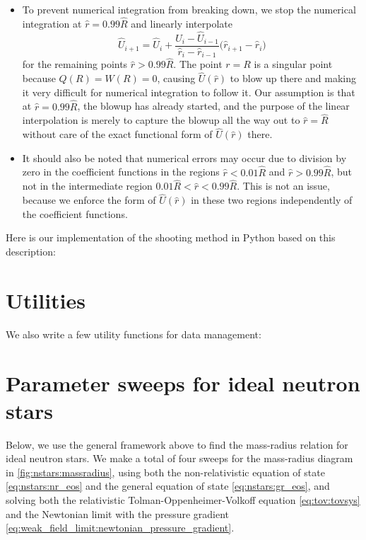 \begin{itemize}
\begin{subequations}
      \end{subequations}
\item To prevent numerical integration from breaking down, we stop the numerical integration at $\hat{r} = 0.99 \hat{R}$ and linearly interpolate
      \begin{equation}
          \hat{U}_{i+1} = \hat{U}_i + \frac{\hat{U}_i - \hat{U}_{i-1}}{\hat{r}_i - \hat{r}_{i-1}} \Big( \hat{r}_{i+1} - \hat{r}_i \Big)
      \end{equation}
      for the remaining points $\hat{r} > 0.99 \hat{R}$.
      The point $r=R$ is a singular point because $Q(R) = W(R) = 0$, causing $\hat{U}(\hat{r})$ to blow up there and making it very difficult for numerical integration to follow it.
      Our assumption is that at $\hat{r} = 0.99 \hat{R}$, the blowup has already started, and the purpose of the linear interpolation is merely to capture the blowup all the way out to $\hat{r}=\hat{R}$ without care of the exact functional form of $\hat{U}(\hat{r})$ there.
\item It should also be noted that numerical errors may occur due to division by zero in the coefficient functions in the regions $\hat{r} < 0.01 \hat{R}$ and $\hat{r} > 0.99 \hat{R}$, but not in the intermediate region $0.01 \hat{R} < \hat{r} < 0.99 \hat{R}$.
      This is not an issue, because we enforce the form of $\hat{U}(\hat{r})$ in these two regions independently of the coefficient functions.
\end{itemize}

Here is our implementation of the shooting method in Python based on this description:


\section{Utilities}

We also write a few utility functions for data management:


\section{Parameter sweeps for ideal neutron stars}
\label{sec:num:nstars}

Below, we use the general framework above to find the mass-radius relation for ideal neutron stars.
We make a total of four sweeps for the mass-radius diagram in \cref{fig:nstars:massradius}, using both the non-relativistic equation of state \eqref{eq:nstars:nr_eos} and the general equation of state \eqref{eq:nstars:gr_eos}, and solving both the relativistic Tolman-Oppenheimer-Volkoff equation \eqref{eq:tov:tovsys} and the Newtonian limit with the pressure gradient \eqref{eq:weak_field_limit:newtonian_pressure_gradient}.

